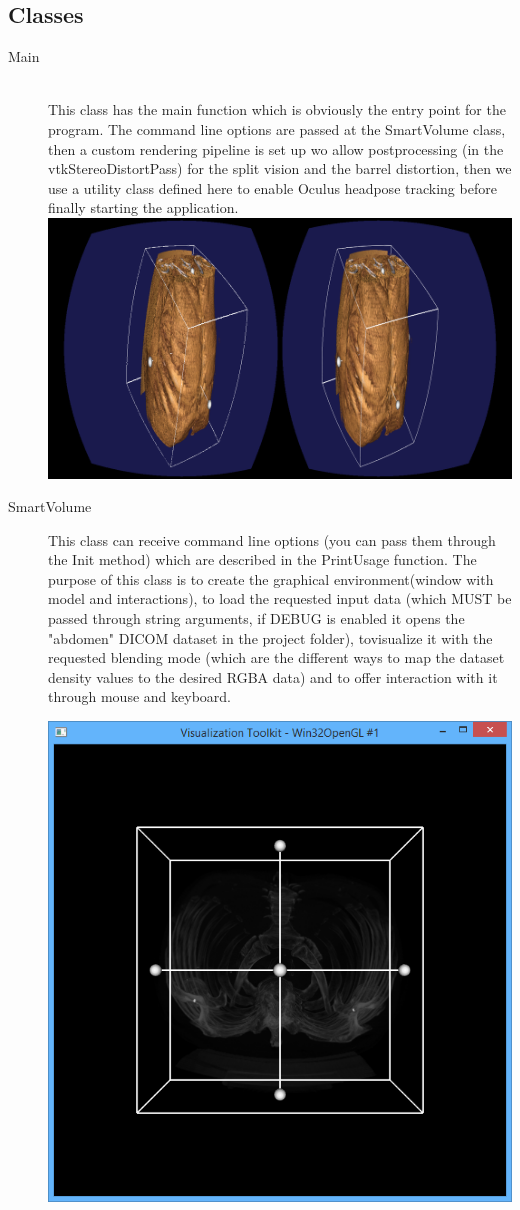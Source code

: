 \documentclass[11pt]{article} %
\begin{document}
\subsection{Classes}
\begin{description}

\item[Main] \hfill \\
This class has the main function which is obviously the entry point for the program. The command line options are passed at the SmartVolume class, then a custom rendering pipeline is set up wo allow postprocessing (in the vtkStereoDistortPass) for the split vision and the barrel distortion, then we use a utility class defined here to enable Oculus headpose tracking before finally starting the application.
\includegraphics[width=1.0\linewidth]{img/main_using.PNG}

\item [SmartVolume]

This class can receive command line options (you can pass them through the Init method) which are described in the PrintUsage function. The purpose of this class is to create the graphical environment(window with model and interactions), to load the requested input data (which MUST be passed through string arguments, if DEBUG is enabled it opens the "abdomen" DICOM dataset in the project folder), tovisualize it with the requested blending mode (which are the different ways to map the dataset density values to the desired RGBA data) and to offer interaction with it through mouse and keyboard.

\centerline{\includegraphics[width=0.5\linewidth]{img/smartvolumetricdemo_startscreen.PNG}}


\end{description}
\end{document}
